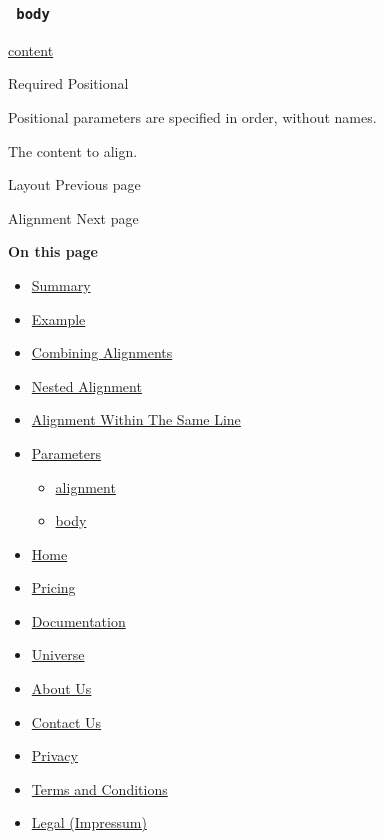 \subsubsection{\texorpdfstring{\texttt{\ body\ }}{ body }}\label{parameters-body}

\href{/docs/reference/foundations/content/}{content}

{Required} {{ Positional }}

\label{parameters-body-positional-tooltip}
Positional parameters are specified in order, without names.

The content to align.

\href{/docs/reference/layout/}{\pandocbounded{}}

{ Layout } { Previous page }

\href{/docs/reference/layout/alignment/}{\pandocbounded{}}

{ Alignment } { Next page }

\textbf{On this page}

\begin{itemize}
\tightlist
\item
  \hyperref[summary]{Summary}
\item
  \hyperref[example]{Example}
\item
  \hyperref[combining-alignments]{Combining Alignments}
\item
  \hyperref[nested-alignment]{Nested Alignment}
\item
  \hyperref[alignment-within-the-same-line]{Alignment Within The Same
  Line}
\item
  \hyperref[parameters]{Parameters}

  \begin{itemize}
  \tightlist
  \item
    \hyperref[parameters-alignment]{alignment}
  \item
    \hyperref[parameters-body]{body}
  \end{itemize}
\end{itemize}

\begin{itemize}
\tightlist
\item
  \href{/}{Home}
\item
  \href{/pricing/}{Pricing}
\item
  \href{/docs/}{Documentation}
\item
  \href{/universe/}{Universe}
\item
  \href{/about/}{About Us}
\item
  \href{/contact/}{Contact Us}
\item
  \href{/privacy/}{Privacy}
\item
  \href{https://typst.app/terms}{Terms and Conditions}
\item
  \href{/legal/}{Legal (Impressum)}
\end{itemize}

